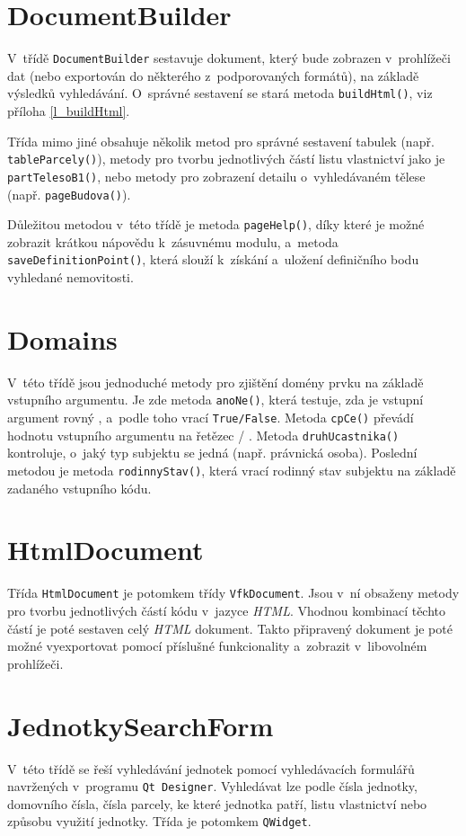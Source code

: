 \documentclass[a4paper,12pt,oneside]{book}
\begin{document}
\section*{DocumentBuilder}
V~třídě \texttt{DocumentBuilder} sestavuje dokument, který bude
zobrazen v~prohlížeči dat (nebo exportován do některého
z~podporovaných formátů), na základě výsledků vyhledávání. O~správné
sestavení se stará metoda \texttt{buildHtml()}, viz příloha
\ref{l_buildHtml}.

Třída mimo jiné obsahuje několik metod pro správné sestavení tabulek
(např. \texttt{tableParcely()}), metody pro tvorbu jednotlivých částí
listu vlastnictví jako je \texttt{partTelesoB1()}, nebo metody pro
zobrazení detailu o~vyhledávaném tělese (např. \texttt{pageBudova()}).

Důležitou metodou v~této třídě je metoda \texttt{pageHelp()}, díky
které je možné zobrazit krátkou nápovědu k~zásuvnému modulu, a~metoda
\texttt{saveDefinitionPoint()}, která slouží
k~získání a~uložení definičního bodu vyhledané nemovitosti.

\section*{Domains}
V~této třídě jsou jednoduché metody pro zjištění domény prvku na
základě vstupního argumentu. Je zde metoda \texttt{anoNe()}, která
testuje, zda je vstupní argument rovný , a~podle toho vrací
\texttt{True/False}. Metoda \texttt{cpCe()} převádí hodnotu
vstupního argumentu na řetězec  / . Metoda \texttt{druhUcastnika()} kontroluje, o~jaký
typ subjektu se jedná (např. právnická osoba). Poslední metodou je
metoda \texttt{rodinnyStav()}, která vrací rodinný stav subjektu na
základě zadaného vstupního kódu.

\section*{HtmlDocument}

Třída \texttt{HtmlDocument} je potomkem třídy \texttt{VfkDocument}. 
Jsou v~ní obsaženy metody pro tvorbu
jednotlivých částí kódu v~jazyce \textit{HTML}. Vhodnou kombinací
těchto částí je poté sestaven celý \textit{HTML} dokument. Takto
připravený dokument je poté možné vyexportovat pomocí příslušné
funkcionality a~zobrazit v~libovolném prohlížeči.

\section*{JednotkySearchForm}
V~této třídě se řeší vyhledávání jednotek pomocí vyhledávacích
formulářů navržených v~programu \texttt{Qt Designer}. Vyhledávat lze
podle čísla jednotky, domovního čísla, čísla parcely, ke které
jednotka patří, listu vlastnictví nebo způsobu využití jednotky. Třída
je potomkem \texttt{QWidget}.
\end{document}
